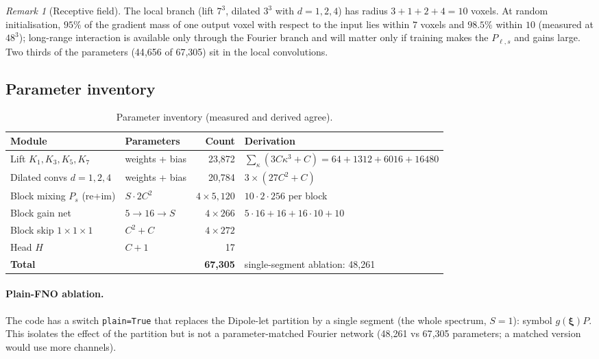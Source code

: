 \documentclass[11pt]{article}
\newcommand{\bxi}{\bm{\xi}}
\newcommand{\code}[1]{\texttt{#1}}
\theoremstyle{remark}
\newtheorem{remark}{Remark}
\begin{document}
\begin{remark}[Receptive field]
The local branch (lift $7^3$, dilated $3^3$ with $d=1,2,4$) has radius $3+1+2+4=10$ voxels. At random initialisation, $95\%$ of the gradient mass of one output voxel with respect to the input lies within $7$ voxels and $98.5\%$ within $10$ (measured at $48^3$);
long-range interaction is available only through the Fourier branch and will matter only if training makes the $P_{\ell,s}$ and gains large. Two thirds of the parameters (44{,}656 of 67{,}305) sit in the local convolutions.
\end{remark}

\subsection{Parameter inventory}
\begin{table}[h]
\centering
\begin{tabular}{@{}llrl@{}}
\toprule
Module & Parameters & Count & Derivation \\
\midrule
Lift $K_1,K_3,K_5,K_7$ & weights + bias & 23{,}872 & $\sum_\kappa(3C\kappa^3+C)=64+1312+6016+16480$ \\
Dilated convs $d=1,2,4$ & weights + bias & 20{,}784 & $3\times(27C^2+C)$ \\
Block mixing $P_s$ (re+im) & $S\cdot2C^2$ & $4\times5{,}120$ & $10\cdot2\cdot256$ per block \\
Block gain net & $5\!\to\!16\!\to\!S$ & $4\times266$ & $5\cdot16+16+16\cdot10+10$ \\
Block skip $1\times1\times1$ & $C^2+C$ & $4\times272$ & \\
Head $H$ & $C+1$ & 17 & \\
\midrule
\textbf{Total} & & \textbf{67{,}305} & single-segment ablation: 48{,}261 \\
\bottomrule
\end{tabular}
\caption{Parameter inventory (measured and derived agree).}
\end{table}

\paragraph{Plain-FNO ablation.} The code has a switch \code{plain=True} that replaces the Dipole-let partition by a single segment (the whole spectrum, $S=1$): symbol $g(\bxi)P$. This isolates the effect of the partition but is not a parameter-matched
Fourier network (48{,}261 vs 67{,}305 parameters; a matched version would use more channels).
\end{document}
